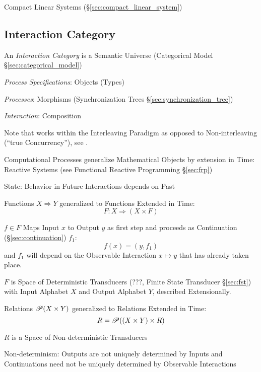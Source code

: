Compact Linear Systems (\S\ref{sec:compact_linear_system})

\cite{abramsky-gay-nagarajan96}



\subsection{Interaction Category}\label{sec:interaction_category}
\cite{abramsky-gay-nagarajan96}

An \emph{Interaction Category} is a Semantic Universe (Categorical
Model \S\ref{sec:categorical_model})

\emph{Process Specifications}: Objects (Types)

\emph{Processes}: Morphisms (Synchronization Trees
\S\ref{sec:synchronization_tree})

\emph{Interaction}: Composition

\fist Note that \cite{abramsky-gay-nagarajan96} works within the
Interleaving Paradigm as opposed to Non-interleaving (``true
Concurrency''), see \cite{winskel-nielsen93}.

Computational Processes generalize Mathematical Objects by extension
in Time: Reactive Systems (see Functional Reactive Programming
\S\ref{sec:frp})

State: Behavior in Future Interactions depends on Past

Functions $X \Rightarrow Y$ generalized to Functions Extended in Time:
\[
  F : X \Rightarrow (X \times F)
\]

$f \in F$ Maps Input $x$ to Output $y$ as first step and proceeds as
Continuation (\S\ref{sec:continuation}) $f_1$:
\[
  f(x) = (y,f_1)
\]
and $f_1$ will depend on the Observable Interaction $x \mapsto y$ that
has already taken place.

$F$ is Space of Deterministic Transducers (???, Finite State
Transducer \S\ref{sec:fst}) with Input Alphabet $X$ and Output
Alphabet $Y$, described Extensionally.

Relations $\mathscr{P}(X \times Y)$ generalized to Relations Extended in
Time:
\[
  R = \mathscr{P}((X \times Y) \times R)
\]

$R$ is a Space of Non-deterministic Transducers

Non-determinism: Outputs are not uniquely determined by Inputs and
Continuations need not be uniquely determined by Observable Interactions

